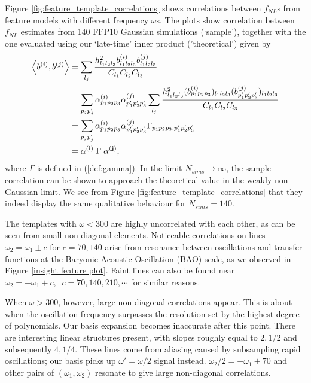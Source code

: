 Figure \ref{fig:feature_template_correlations} shows correlations between $f_{NL}$s from feature models with different frequency $\omega$s. The plots show correlation between $f_{NL}$ estimates from 140 FFP10 Gaussian simulations (`sample'), together with the one evaluated using our `late-time' inner product ('theoretical') given by
\begin{align}
	\left< b^{(i)}, b^{(j)} \right> &= \sum_{l_j} \frac{h^2_{l_1 l_2 l_3} b^{(i)}_{l_1 l_2 l_3} b^{(j)}_{l_1 l_2 l_3}}{C_{l_1} C_{l_2} C_{l_3}}  \\
	&= \sum_{p_j p'_j} \alpha^{(i)}_{p_1 p_2 p_3} \alpha^{(j)}_{p'_1 p'_2 p'_3} \sum_{l_j} \frac{h^2_{l_1 l_2 l_3} (b^{(i)}_{p_1 p_2 p_3})_{l_1 l_2 l_3} (b^{(j)}_{p'_1 p'_2 p'_3})_{l_1 l_2 l_3}}{C_{l_1} C_{l_2} C_{l_3}} \\
	&= \sum_{p_j p'_j} \alpha^{(i)}_{p_1 p_2 p_3} \alpha^{(j)}_{p'_1 p'_2 p'_3} \Gamma_{p_1 p_2 p_3, p'_1 p'_2 p'_3} \\
	&= \mathbf{\alpha^{(i)}} \; \Gamma \; \mathbf{\alpha^{(j)}}, \label{eqn:late_time_inner_product}
\end{align}
where $\Gamma$ is defined in (\ref{def:gamma}). In the limit $N_{sims} \rightarrow \infty$, the sample correlation can be shown to approach the theoretical value in the weakly non-Gaussian limit. We see from Figure \ref{fig:feature_template_correlations} that they indeed display the same qualitative behaviour for $N_{sims}=140$.

The templates with $\omega < 300$ are highly uncorrelated with each other, as can be seen from small non-diagonal elements. Noticeable correlations on lines $\omega_2 = \omega_1 \pm c$ for $c = 70, 140$ arise from resonance between oscillations and transfer functions at the Baryonic Acoustic Oscillation (BAO) scale, as we observed in Figure \ref{insight feature plot}. Faint lines can also be found near $\omega_2 = -\omega_1 + c, \;\; c = 70,140,210,\cdots$ for similar reasons.

When $\omega > 300$, however, large non-diagonal correlations appear. This is about when the oscillation frequency surpasses the resolution set by the highest degree of polynomials. Our basis expansion becomes inaccurate after this point. There are interesting linear structures present, with slopes roughly equal to $2, 1/2$ and subsequently $4, 1/4$. These lines come from aliasing caused by subsampling rapid oscillations; our basis picks up $\omega' = \omega/2$ signal instead. $\omega_2/2 = -\omega_1 + 70$ and other pairs of $(\omega_1, \omega_2)$ resonate to give large non-diagonal correlations.

